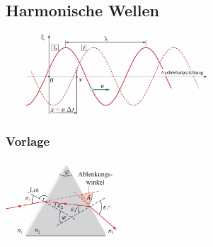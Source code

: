 \subsection{Harmonische Wellen}
\begin{center}
	\begin{minipage}{0.3\textwidth}
	\end{minipage}%
	\begin{minipage}{0.3\textwidth}
		\includegraphics[height=3cm,keepaspectratio=true]{Images/harmonische_welle.png}
	\end{minipage}
\end{center}



























\subsubsection{Vorlage}

\begin{center}
	\begin{minipage}{0.3\textwidth}
		
	\end{minipage}%
	\begin{minipage}{0.3\textwidth}
		\includegraphics[height=3cm,keepaspectratio=true]{Images/prisma.png}
	\end{minipage}
\end{center}
